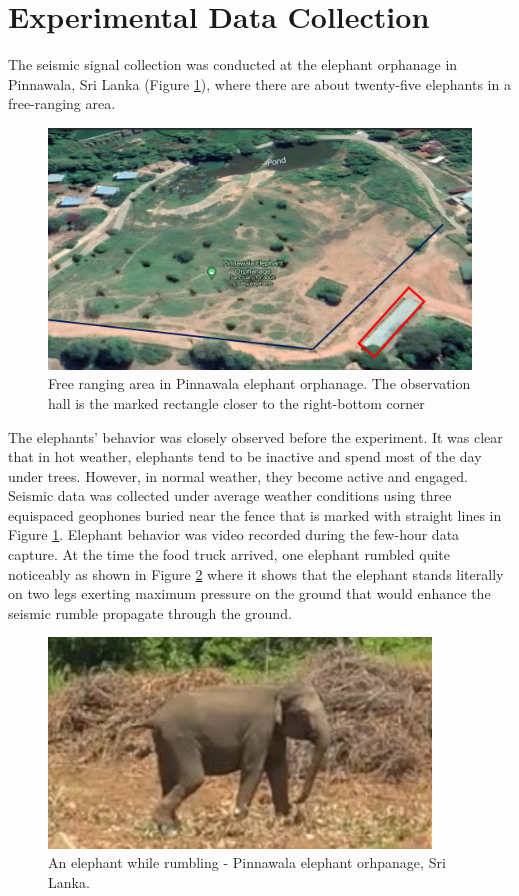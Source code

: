 \documentclass[applsci,article,accept,moreauthors,pdftex]{Definitions/mdpi}
\begin{document}
\section{Experimental Data Collection}
The seismic signal collection was conducted at the elephant orphanage in Pinnawala, Sri Lanka (Figure \ref{fig:figure3nn}), where there are about twenty-five elephants in a free-ranging area.
\begin{figure}[t!]
	\centering   \includegraphics[width=4.5in]{figures/PinnawalaMap}
	\caption{Free ranging area in Pinnawala elephant orphanage. The observation hall is the marked rectangle closer to the right-bottom corner}
	\label{fig:figure3nn}
\end{figure}
The elephants’ behavior was closely observed before the experiment. It was clear that in hot weather, elephants tend to be inactive and spend most of the day under trees. However, in normal weather, they become active and engaged. Seismic data was collected under average weather conditions using three equispaced geophones buried near the fence that is marked with straight lines in Figure \ref{fig:figure3nn}. Elephant behavior was video recorded during the few-hour data capture. At the time the food truck arrived, one elephant rumbled quite noticeably as shown in Figure \ref{fig_rumble} where it shows that the elephant stands literally on two legs exerting maximum pressure on the ground that would enhance the seismic rumble propagate through the ground.
\begin{figure}
	\centering   \includegraphics[width=4in]{figures/rumble.png}
	\caption{An elephant while rumbling - Pinnawala elephant orhpanage, Sri Lanka.}
	\label{fig_rumble}
\end{figure}
\end{document}
